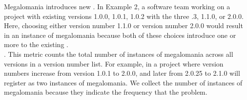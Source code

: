 \documentclass[conference]{IEEEtran}
\begin{document}
Megalomania introduces new \numberchoices.
In Example 2, a software team working on a project with existing versions 1.0.0, 1.0.1, 1.0.2 with the three .3, 1.1.0, or 2.0.0. 
Here, choosing either version number 1.1.0 or version number 2.0.0 would result in an instance of megalomania because both of these choices introduce one or more \choices to the existing \choices. \\





%
%

%

.  
This metric counts the total number of instances of megalomania across all versions in a version number list.
For example, in a project where version numbers increase from version 1.0.1 to 2.0.0, and later from 2.0.25 to 2.1.0 will register as two instances of megalomania.
We collect the number of instances of megalomania because they indicate the frequency that the problem. \\
\end{document}
